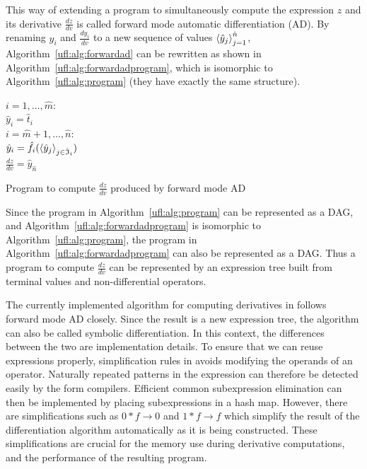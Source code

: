 This way of extending a program to simultaneously compute the
expression $z$ and its derivative $\frac{d z}{d v}$ is called forward
mode automatic differentiation (AD).  By renaming $y_i$ and $\frac{d
  y_i}{d v}$ to a new sequence of values $\left\langle{\hat y_j}\right\rangle_{j=1}^{\hat
  n}$, Algorithm~\ref{ufl:alg:forwardad} can be rewritten as shown in
Algorithm~\ref{ufl:alg:forwardadprogram}, which is isomorphic to
Algorithm~\ref{ufl:alg:program} (they have exactly the same
structure).
\begin{algorithm}
\afor $i = 1, \ldots, \hat m$:\\
\tab $\hat y_i = \hat t_i$ \\
\afor $i = \hat m + 1, \ldots, \hat n$:\\
\tab $\hat y_i = \hat f_i(\left\langle{\hat y_j}\right\rangle_{j\in\hat{\mathfrak{I}}_i})$ \\
$\frac{d z}{d v} = \hat y_{\hat n}$
\caption{Program to compute $\frac{d z}{d v}$ produced by forward mode AD}
\label{ufl:alg:forwardadprogram}
\end{algorithm}

Since the program in Algorithm~\ref{ufl:alg:program} can be
represented as a DAG, and Algorithm~\ref{ufl:alg:forwardadprogram} is
isomorphic to Algorithm~\ref{ufl:alg:program}, the program in
Algorithm~\ref{ufl:alg:forwardadprogram} can also be represented as a
DAG.  Thus a program to compute $\frac{d z}{d v}$ can be represented
by an expression tree built from terminal values and non-differential
operators.

The currently implemented algorithm for computing derivatives in
\ufl{} follows forward mode AD closely. Since the result is a new
expression tree, the algorithm can also be called symbolic
differentiation. In this context, the differences between the two are
implementation details.  To ensure that we can reuse expressions
properly, simplification rules in \ufl{} avoids modifying the operands
of an operator.  Naturally repeated patterns in the expression can
therefore be detected easily by the form compilers.  Efficient common
subexpression elimination can then be implemented by placing
subexpressions in a hash map.  However, there are simplifications such
as $0*f\rightarrow 0$ and $1*f\rightarrow f$ which simplify the result
of the differentiation algorithm automatically as it is being
constructed.  These simplifications are crucial for the memory use
during derivative computations, and the performance of the resulting
program.


